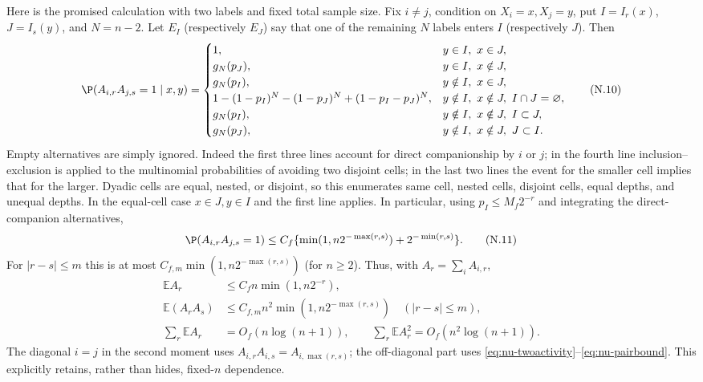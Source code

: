 \documentclass[11pt]{article}
\numberwithin{equation}{section}
\newcommand{\E}{\mathbb E}\newcommand{\Pp}{\mathbb P}
\newcommand{\1}{\mathbf 1}\newcommand{\F}{\mathcal F}\newcommand{\D}{\mathcal D}
\begin{document}
Here is the promised calculation with two labels and fixed total sample size.
Fix $i\ne j$, condition on $X_i=x,X_j=y$, put $I=I_r(x)$, $J=I_s(y)$,
and $N=n-2$.  Let $E_I$ (respectively $E_J$) say that one of the remaining
$N$ labels enters $I$ (respectively $J$).  Then
\begin{equation}\label{eq:nu-twoactivity}
 \P(A_{i,r}A_{j,s}=1\mid x,y)=
 \begin{cases}
 1,&y\in I,\ x\in J,\\
 g_N(p_J),&y\in I,\ x\notin J,\\
 g_N(p_I),&y\notin I,\ x\in J,\\
 1-(1-p_I)^N-(1-p_J)^N+(1-p_I-p_J)^N,
     &y\notin I,\ x\notin J,\ I\cap J=\varnothing,\\
 g_N(p_I),&y\notin I,\ x\notin J,\ I\subset J,\\
 g_N(p_J),&y\notin I,\ x\notin J,\ J\subset I.
 \end{cases}                                                   \tag{N.10}
\end{equation}
Empty alternatives are simply ignored.  Indeed the first three lines account
for direct companionship by $i$ or $j$; in the fourth line inclusion--exclusion
is applied to the multinomial probabilities of avoiding two disjoint cells;
in the last two lines the event for the smaller cell implies that for the
larger.  Dyadic cells are equal, nested, or disjoint, so this enumerates same
cell, nested cells, disjoint cells, equal depths, and unequal depths.  In the
equal-cell case $x\in J,y\in I$ and the first line applies.  In particular,
using $p_I\le M_f2^{-r}$ and integrating the direct-companion alternatives,
\begin{equation}\label{eq:nu-pairbound}
 \P(A_{i,r}A_{j,s}=1)\le C_f\{\min(1,n2^{-\max(r,s)})
                              +2^{-\min(r,s)}\}.               \tag{N.11}
\end{equation}
For $|r-s|\le m$ this is at most $C_{f,m}\min(1,n2^{-\max(r,s)})$ (for
$n\ge2$).  Thus, with $A_r=\sum_iA_{i,r}$,
\begin{align}
 \E A_r&\le C_fn\min(1,n2^{-r}),\label{eq:nu-Asum1}\\
 \E(A_rA_s)&\le C_{f,m}n^2\min(1,n2^{-\max(r,s)})
       \quad(|r-s|\le m),\label{eq:nu-Asum2}\\
 \sum_r\E A_r&=O_f(n\log(n+1)),\qquad
 \sum_r\E A_r^2=O_f(n^2\log(n+1)).                            \tag{N.12}
\end{align}
The diagonal $i=j$ in the second moment uses $A_{i,r}A_{i,s}=A_{i,\max(r,s)}$;
the off-diagonal part uses \eqref{eq:nu-twoactivity}--\eqref{eq:nu-pairbound}.
This explicitly retains, rather than hides, fixed-$n$ dependence.
\end{document}
